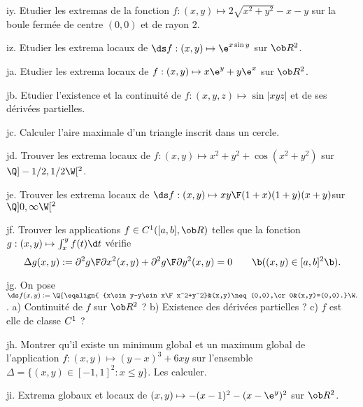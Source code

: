 \exo [Level=2,Fight=1,Learn=1,Type=\Exercices,Field=\Extrema,Origin=] iy. 
Etudier les extremas de la fonction $f:(x,y)\mapsto2\sqrt{x^2+y^2}-x-y$ sur la boule fermée 
de centre $(0,0)$ et de rayon $2$. 

\exo [Level=2,Fight=1,Learn=1,Type=\Exercices,Field=\Extrema,Origin=] iz. 
Etudier les extrema locaux de $\ds f:(x,y)\mapsto\e^{x\sin y}$ sur $\ob R^2$.  

\exo [Level=2,Fight=2,Learn=1,Type=\Exercices,Field=\Extrema,Origin=] ja. 
Etudier les extrema locaux de $f:(x,y)\mapsto x\e^y+y\e^x$ sur $\ob R^2$. 

\exo [Level=2,Fight=3,Learn=1,Type=\Others,Field=\Extrema,Origin=] jb. 
Etudier l'existence et la continuité de $f:(x,y,z)\mapsto\sin|xyz|$ 
et de ses dérivées partielles. 

\exo [Level=2,Fight=2,Learn=2,Type=\Cours,Field=\Extrema,Origin=] jc. 
Calculer l'aire maximale d'un triangle inscrit dans un cercle. 

\exo [Level=2,Fight=1,Learn=1,Type=\Exercices,Field=\Extrema,Origin=] jd. 
Trouver les extrema locaux de $f:(x,y)\mapsto x^2+y^2+\cos(x^2+y^2)$ sur $\Q]-1/2,1/2\W[^2$. 

\exo [Level=2,Fight=1,Learn=1,Type=\Exercices,Field=\Extrema,Origin=] je. 
Trouver les extrema locaux de $\ds f:(x,y)\mapsto{xy\F(1+x)(1+y)(x+y)}$sur $\Q]0,\infty\W[^2$ 

\exo [Level=2,Fight=2,Learn=1,Field=\EquationsAuxDérivéesPartielles,Type=\Exercices,Origin=] jf. 
Trouver les applications $f\in\sc C^1([a,b],\ob R)$ telles 
que la fonction $g:(x,y)\mapsto \int_x^yf(t)\d t$ 
vérifie 
$$
\Delta g(x,y):={\partial^2 g\F\partial x^2}(x,y)+{\partial^2 g\F\partial y^2}(x,y)=0\qquad\b((x,y)\in[a,b]^2\b). 
$$

\exo [Level=2,Fight=2,Learn=2,Field=\FonctionsDePlusieursVariables,Type=\Exercices,Origin=] jg. 
On pose $\ds f(x,y):=\Q\{\eqalign{
{x\sin y-y\sin x\F x^2+y^2}&(x,y)\neq(0,0),\cr
0&(x,y)=(0,0).}
\W.$. \medskip\noindent
a) Continuité de $f$ sur $\ob R^2$ ? \pn 
b) Existence des dérivées partielles ? \pn 
c) $f$ est elle de classe $\sc C^1$ ?

\exo [Level=2,Fight=2,Learn=2,Type=\Exercices,Field=\Extrema,Origin=] jh. 
Montrer qu'il existe un minimum global et un maximum global de l'application $f:(x,y)\mapsto(y-x)^3+6xy$ sur l'ensemble $\Delta=\{(x,y)\in[-1,1]^2:x\le y\}$. 
Les calculer. 

\exo [Level=2,Fight=1,Learn=1,Type=\Exercices,Field=\Extrema,Origin=] ji. 
Extrema globaux et locaux de $(x,y)\mapsto -(x-1)^2-(x-\e^y)^2$ sur $\ob R^2$. 

